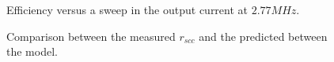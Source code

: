 
\begin{figure}[!h]
    \newcommand\pHeigh{4.5cm}
    \newcommand\pWidth{8cm}
    \centering
    
    \caption[]{Efficiency versus a sweep in the output current at $2.77MHz$.}
    \label{fig:eff_vled}
\end{figure}

\begin{figure}[!h]
    \newcommand\pHeigh{4.5cm}
    \newcommand\pWidth{8cm}
    \centering
    
    \caption[]{Comparison between the measured $r_{scc}$ and the predicted between the model.}
    \label{fig:rscc_vled}
\end{figure}


%
%
%
%
%
